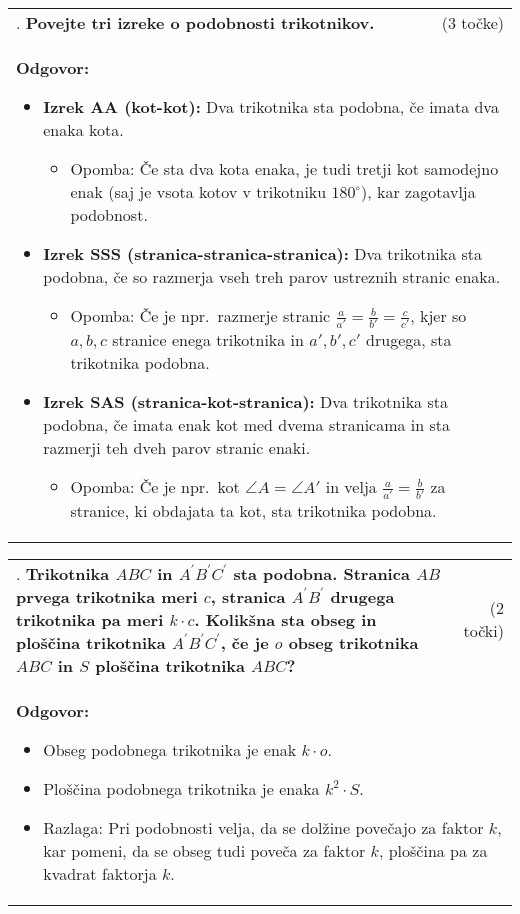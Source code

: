 \documentclass[12pt]{article}
\newcounter{vprasanje}[section]
\renewcommand{\thevprasanje}{\roman{vprasanje}}
\newcommand{\vprasanje}[2]{%
  \stepcounter{vprasanje}%
  \textbf{\thevprasanje}. \textbf{#1} & (#2) \\
}
\newcommand{\odgovor}[1]{%
  \multicolumn{2}{p{\dimexpr\textwidth-2\tabcolsep\relax}}{%
    \small \textbf{Odgovor:} #1%
  } \\[1em]%
}
\begin{document}
\begin{tabularx}{\textwidth}{X r}
    \vprasanje{\textbf{Povejte tri izreke o podobnosti trikotnikov.}}{3 točke}
    \odgovor{%
        \begin{itemize}
            \item \textbf{Izrek AA (kot-kot):}  
                Dva trikotnika sta podobna, če imata dva enaka kota. 
                \begin{itemize}
	                \item Opomba: Če sta dva kota enaka, je tudi tretji kot samodejno enak (saj je vsota kotov v trikotniku $180^\circ$), kar zagotavlja podobnost.
		\end{itemize}
            \item \textbf{Izrek SSS (stranica-stranica-stranica):}  
                Dva trikotnika sta podobna, če so razmerja vseh treh parov ustreznih stranic enaka. 
                \begin{itemize}
                		\item Opomba: Če je npr.\ razmerje stranic $\frac{a}{a'} = \frac{b}{b'} = \frac{c}{c'}$, kjer so $a, b, c$ stranice enega trikotnika in $a', b', c'$ drugega, sta trikotnika podobna.
                \end{itemize}

            \item \textbf{Izrek SAS (stranica-kot-stranica):}  
                Dva trikotnika sta podobna, če imata enak kot med dvema stranicama in sta razmerji teh dveh parov stranic enaki. 
                \begin{itemize}
	                \item Opomba: Če je npr.\ kot $\angle A = \angle A'$ in velja $\frac{a}{a'} = \frac{b}{b'}$ za stranice, ki obdajata ta kot, sta trikotnika podobna.
                \end{itemize}
\end{itemize}
}
\end{tabularx}

\begin{tabularx}{\textwidth}{X r}
    \vprasanje{Trikotnika $ABC$ in $A^{\prime}B^{\prime}C^{\prime}$ sta podobna. Stranica $AB$ prvega trikotnika meri $c$, stranica $A^{\prime}B^{\prime}$ drugega trikotnika pa meri $k \cdot c$. Kolikšna sta obseg in ploščina trikotnika $A^{\prime}B^{\prime}C^{\prime}$, če je $o$ obseg trikotnika $ABC$ in $S$ ploščina trikotnika $ABC$?}{2 točki}
    \odgovor{%
        \begin{itemize}
            \item Obseg podobnega trikotnika je enak $k \cdot o$.
            \item Ploščina podobnega trikotnika je enaka $k^2 \cdot S$.
            \item Razlaga: Pri podobnosti velja, da se dolžine povečajo za faktor $k$, kar pomeni, da se obseg tudi poveča za faktor $k$, ploščina pa za kvadrat faktorja $k$.
        \end{itemize}
    }
\end{tabularx}
\end{document}
